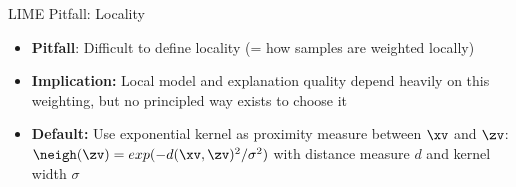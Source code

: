 \documentclass[11pt,compress,t,notes=noshow, aspectratio=169, xcolor=table]{beamer}
\begin{document}
\begin{frame}{LIME Pitfall: Locality}

	\begin{itemize} 
     \item \textbf{Pitfall}: Difficult to define locality (= how samples are weighted locally) %
     \item \textbf{Implication:} Local model and explanation quality depend heavily on this weighting, but no principled way exists to choose it

     \item \textbf{Default:} Use exponential kernel as proximity measure between $\xv$ and $\zv$:\\
     	$\neigh(\zv) = exp(-d(\xv, \zv)^2/\sigma^2)$ with distance measure $d$ and kernel width $\sigma$
     		
     		

\end{itemize}
\end{frame}
\end{document}
